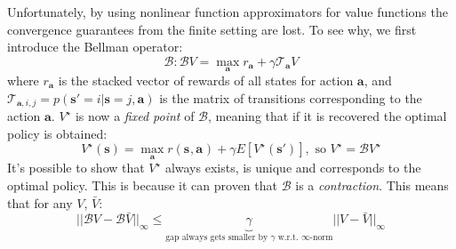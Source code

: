 Unfortunately, by using nonlinear function approximators for value functions the convergence 
guarantees from the finite setting are lost.
To see why, we first introduce the Bellman operator:
\begin{equation}
		\mathcal{B}: \mathcal{B}V = \max_{\bm{a}} r_{\bm{a}} + \gamma \mathcal{T}_{\bm{a}}V
\end{equation}
where $r_{\bm{a}}$ is the stacked vector of rewards of all states for action $\bm{a}$,
and $\mathcal{T}_{\bm{a},i,j} = p (\bm{s}' = i | \bm{s} = j, \bm{a}) $ is the matrix of transitions corresponding to the action $\bm{a}$.
$V^\star$ is now a \textit{fixed point} of $\mathcal{B}$, 
meaning that if it is recovered the optimal policy is obtained:
\begin{equation}
		V^\star(\bm{s}) = \max_{\bm{a}} r(\bm{s}_{}, \bm{a}_{}) + \gamma E[V^\star(\bm{s}')], \text{ so } V^\star = \mathcal{B}V^\star
\end{equation}
It's possible to show that $V^\star$ always exists, is unique and corresponds to the optimal policy.
This is because
it can proven that $\mathcal{B}$ is a \textit{contraction}. This means that for any $V$, $\bar{V}$: 
\begin{equation}
		|| \mathcal{B}V - \mathcal{B}\bar{V}||_\infty \leq \underbrace{\gamma}_{\text{gap always gets smaller by } \gamma \text{ w.r.t. } \infty \text{-norm}} || V - \bar{V}||_\infty
\end{equation}

